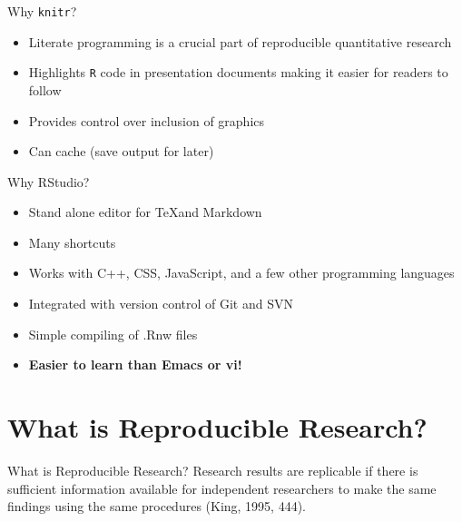 \documentclass{beamer}\usepackage[]{graphicx}\usepackage[]{color}
\begin{document}
 \begin{frame}[t]{Why \texttt{knitr}?}
  \begin{itemize}
    \item Literate programming is a crucial part of reproducible quantitative research
    \item Highlights \texttt{R} code in presentation documents making it easier for readers to follow
    \item Provides control over inclusion of graphics
    \item Can cache (save output for later)
   \end{itemize}
 \end{frame}

 \begin{frame}[t]{Why RStudio?}
  \begin{itemize}
    \item Stand alone editor for \TeX  and Markdown
    \item Many shortcuts
    \item Works with C++, CSS, JavaScript, and a few other programming languages
    \item Integrated with version control of Git and SVN
    \item Simple compiling of .Rnw files
    \item \textbf{Easier to learn than Emacs or vi!}
   \end{itemize}
 \end{frame}

\section{What is Reproducible Research?}

\begin{frame}[t]{What is Reproducible Research?}
     Research results are replicable if there is sufficient information available for independent researchers to make the same findings using the same procedures (King, 1995, 444). \\ \vspace{2cm}
  \end{frame}
\end{document}
